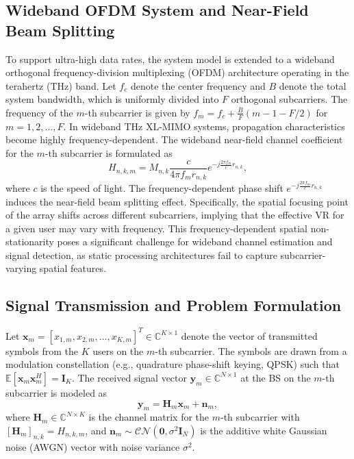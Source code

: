 \subsection{Wideband OFDM System and Near-Field Beam Splitting}
To support ultra-high data rates, the system model is extended to a wideband orthogonal frequency-division multiplexing (OFDM) architecture operating in the terahertz (THz) band. Let $f_c$ denote the center frequency and $B$ denote the total system bandwidth, which is uniformly divided into $F$ orthogonal subcarriers. The frequency of the $m$-th subcarrier is given by $f_m = f_c + \frac{B}{F}(m - 1 - F/2)$ for $m = 1, 2, \dots, F$. In wideband THz XL-MIMO systems, propagation characteristics become highly frequency-dependent. The wideband near-field channel coefficient for the $m$-th subcarrier is formulated as
\begin{equation}
    H_{n,k,m} = M_{n,k} \frac{c}{4\pi f_m r_{n,k}} e^{-j \frac{2\pi f_m}{c} r_{n,k}},
\end{equation}
where $c$ is the speed of light. The frequency-dependent phase shift $e^{-j \frac{2\pi f_m}{c} r_{n,k}}$ induces the near-field beam splitting effect. Specifically, the spatial focusing point of the array shifts across different subcarriers, implying that the effective VR for a given user may vary with frequency. This frequency-dependent spatial non-stationarity poses a significant challenge for wideband channel estimation and signal detection, as static processing architectures fail to capture subcarrier-varying spatial features.

\subsection{Signal Transmission and Problem Formulation}
Let $\mathbf{x}_m = [x_{1,m}, x_{2,m}, \dots, x_{K,m}]^T \in \mathbb{C}^{K \times 1}$ denote the vector of transmitted symbols from the $K$ users on the $m$-th subcarrier. The symbols are drawn from a modulation constellation (e.g., quadrature phase-shift keying, QPSK) such that $\mathbb{E}[\mathbf{x}_m \mathbf{x}_m^H] = \mathbf{I}_K$. The received signal vector $\mathbf{y}_m \in \mathbb{C}^{N \times 1}$ at the BS on the $m$-th subcarrier is modeled as
\begin{equation}
    \mathbf{y}_m = \mathbf{H}_m \mathbf{x}_m + \mathbf{n}_m,
\end{equation}
where $\mathbf{H}_m \in \mathbb{C}^{N \times K}$ is the channel matrix for the $m$-th subcarrier with $[\mathbf{H}_m]_{n,k} = H_{n,k,m}$, and $\mathbf{n}_m \sim \mathcal{CN}(\mathbf{0}, \sigma^2 \mathbf{I}_N)$ is the additive white Gaussian noise (AWGN) vector with noise variance $\sigma^2$. 


